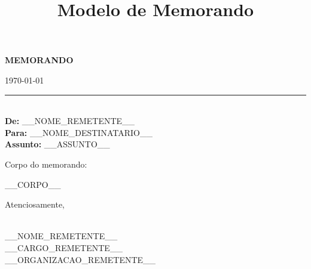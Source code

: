 \documentclass[a4paper,12pt]{article}
\title{Modelo de Memorando}
\author{}
\date{}
\begin{document}
\begin{center}
    \textbf{MEMORANDO}
\end{center}

\bigskip

\begin{flushright}
    \today \\
    \rule{5cm}{0.4pt} \\
    \textbf{De:} __NOME_REMETENTE__ \\
    \textbf{Para:} __NOME_DESTINATARIO__ \\
    \textbf{Assunto:} __ASSUNTO__
\end{flushright}

\bigskip

Corpo do memorando:

\bigskip

__CORPO__

\bigskip

Atenciosamente,

\bigskip

\hrulefill \\
__NOME_REMETENTE__ \\
__CARGO_REMETENTE__ \\
__ORGANIZACAO_REMETENTE__
\end{document}
